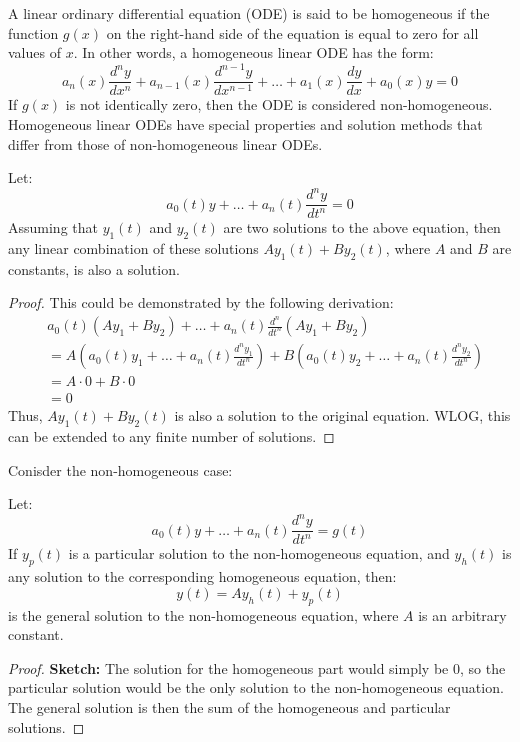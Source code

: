 \documentclass[11pt]{article}
\begin{document}
\begin{definition}
    A linear ordinary differential equation (ODE) is said to be homogeneous if the function \( g(x) \) on the right-hand side of the equation is equal to zero for all values of \( x \). In other words, a homogeneous linear ODE has the form:
    $$
    a_n(x) \frac{d^n y}{dx^n} + a_{n-1}(x) \frac{d^{n-1} y}{dx^{n-1}} + \ldots + a_1(x) \frac{dy}{dx} + a_0(x) y = 0
    $$
    If \( g(x) \) is not identically zero, then the ODE is considered non-homogeneous. Homogeneous linear ODEs have special properties and solution methods that differ from those of non-homogeneous linear ODEs.
\end{definition}

\begin{theorem}
    Let:
    $$
    a_0(t)y + \dots + a_n(t) \frac{d^n y}{dt^n} =0
    $$
    Assuming that $y_1(t)$ and $y_2(t)$ are two solutions to the above equation, then any linear combination of these solutions $A y_1(t) + B y_2(t)$, where \( A \) and \( B \) are constants, is also a solution.
\end{theorem}
\begin{proof}
    This could be demonstrated by the following derivation:
    \begin{align*}
        & a_0(t)(A y_1 + B y_2) + \dots + a_n(t) \frac{d^n}{dt^n}(A y_1 + B y_2) \\ 
        &= A \left( a_0(t)y_1 + \dots + a_n(t) \frac{d^n y_1}{dt^n} \right) + B \left( a_0(t)y_2 + \dots + a_n(t) \frac{d^n y_2}{dt^n} \right) \\
        &= A \cdot 0 + B \cdot 0 \\
        &= 0
    \end{align*}
    Thus, \( A y_1(t) + B y_2(t) \) is also a solution to the original equation. WLOG, this can be extended to any finite number of solutions.
\end{proof}

Conisder the non-homogeneous case:
\begin{theorem}
    Let:
    $$
    a_0(t)y + \dots + a_n(t) \frac{d^n y}{dt^n} =g(t)
    $$
    If \( y_p(t) \) is a particular solution to the non-homogeneous equation, and \( y_h(t) \) is any solution to the corresponding homogeneous equation, then:
    $$
    y(t) = A y_h(t) + y_p(t)
    $$
    is the general solution to the non-homogeneous equation, where \( A \) is an arbitrary constant.
\end{theorem}
\begin{proof}
    \textbf{Sketch:} The solution for the homogeneous part would simply be 0, so the particular solution would be the only solution to the non-homogeneous equation. The general solution is then the sum of the homogeneous and particular solutions.
\end{proof}
\end{document}
